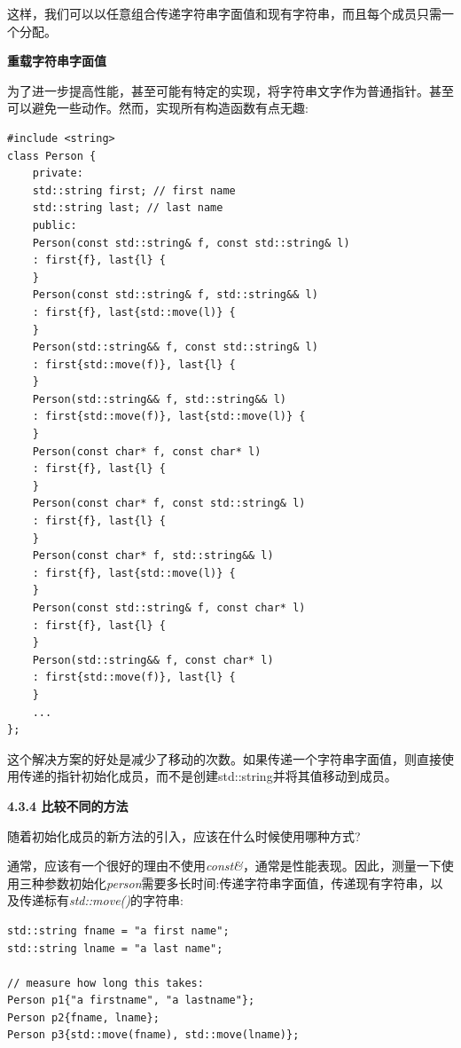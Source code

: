这样，我们可以以任意组合传递字符串字面值和现有字符串，而且每个成员只需一个分配。\par

\hspace*{\fill} \par %
\textbf{重载字符串字面值}

为了进一步提高性能，甚至可能有特定的实现，将字符串文字作为普通指针。甚至可以避免一些动作。然而，实现所有构造函数有点无趣:\par

{\color{red}{basics/initall.hpp}}

\begin{lstlisting}[caption={}]
#include <string>
class Person {
	private:
	std::string first; // first name
	std::string last; // last name
	public:
	Person(const std::string& f, const std::string& l)
	: first{f}, last{l} {
	}
	Person(const std::string& f, std::string&& l)
	: first{f}, last{std::move(l)} {
	}
	Person(std::string&& f, const std::string& l)
	: first{std::move(f)}, last{l} {
	}
	Person(std::string&& f, std::string&& l)
	: first{std::move(f)}, last{std::move(l)} {
	}
	Person(const char* f, const char* l)
	: first{f}, last{l} {
	}
	Person(const char* f, const std::string& l)
	: first{f}, last{l} {
	}
	Person(const char* f, std::string&& l)
	: first{f}, last{std::move(l)} {
	}
	Person(const std::string& f, const char* l)
	: first{f}, last{l} {
	}
	Person(std::string&& f, const char* l)
	: first{std::move(f)}, last{l} {
	}
	...
};
\end{lstlisting}

这个解决方案的好处是减少了移动的次数。如果传递一个字符串字面值，则直接使用传递的指针初始化成员，而不是创建std::string并将其值移动到成员。\par

\hspace*{\fill} \par %
\textbf{4.3.4 比较不同的方法}

随着初始化成员的新方法的引入，应该在什么时候使用哪种方式?\par

通常，应该有一个很好的理由不使用\textit{const\&}，通常是性能表现。因此，测量一下使用三种参数初始化\textit{person}需要多长时间:传递字符串字面值，传递现有字符串，以及传递标有\textit{std::move()}的字符串:\par

\begin{lstlisting}[caption={}]
std::string fname = "a first name";
std::string lname = "a last name";

// measure how long this takes:
Person p1{"a firstname", "a lastname"};
Person p2{fname, lname};
Person p3{std::move(fname), std::move(lname)};
\end{lstlisting}

